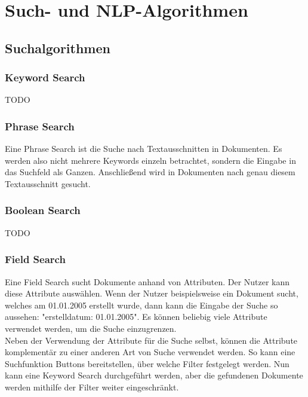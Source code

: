 \chapter{Such- und NLP-Algorithmen}

\section{Suchalgorithmen}

\subsection{Keyword Search}
TODO

\subsection{Phrase Search}
Eine Phrase Search ist die Suche nach Textausschnitten in Dokumenten.
Es werden also nicht mehrere Keywords einzeln betrachtet, sondern die Eingabe in das Suchfeld als Ganzen.
Anschließend wird in Dokumenten nach genau diesem Textausschnitt gesucht.

\subsection{Boolean Search}
TODO

\subsection{Field Search}
Eine Field Search sucht Dokumente anhand von Attributen.
Der Nutzer kann diese Attribute auswählen.
Wenn der Nutzer beispielsweise ein Dokument sucht, welches am 01.01.2005 erstellt wurde, dann kann die Eingabe der Suche so aussehen: "erstelldatum: 01.01.2005".
Es können beliebig viele Attribute verwendet werden, um die Suche einzugrenzen.\\

Neben der Verwendung der Attribute für die Suche selbst, können die Attribute komplementär zu einer anderen Art von Suche verwendet werden.
So kann eine Suchfunktion Buttons bereitstellen, über welche Filter festgelegt werden.
Nun kann eine Keyword Search durchgeführt werden, aber die gefundenen Dokumente werden mithilfe der Filter weiter eingeschränkt.

